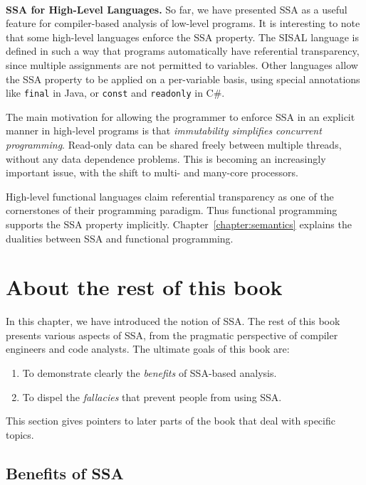~\\ \textbf{SSA for High-Level Languages.} 
So far, we have presented SSA as a useful feature for compiler-based analysis of low-level programs. 
It is interesting to note that some high-level languages enforce the SSA property. 
The SISAL language is defined in such a way that programs automatically have referential transparency, since multiple assignments are not permitted to variables. 
Other languages allow the SSA property to be applied on a per-variable basis, using special annotations like \texttt{final} in Java, or \texttt{const} and \texttt{readonly} in C\#.

The main motivation for allowing the programmer to enforce SSA in an explicit manner in high-level programs is that \textit{immutability simplifies concurrent programming}. 
Read-only data can be shared freely between multiple threads, without any data dependence problems. 
This is becoming an increasingly important issue, with the shift to multi- and many-core processors.

High-level functional languages claim referential transparency as one of the cornerstones of their programming paradigm. 
Thus functional programming supports the SSA property implicitly. 
Chapter~\ref{chapter:semantics} explains the dualities between SSA and functional programming.



\section{About the rest of this book}

In this chapter, we have introduced the notion of SSA. 
The rest of this book presents various aspects of SSA, from the pragmatic perspective of compiler engineers and code analysts. 
The ultimate goals of this book are:
\begin{enumerate}
\item To demonstrate clearly the \emph{benefits} of SSA-based analysis.
\item To dispel the \emph{fallacies} that prevent people from using SSA.
\end{enumerate}
This section gives pointers to later parts of the book that deal with specific topics.


\subsection{Benefits of SSA}
\vspace{-1mm}

